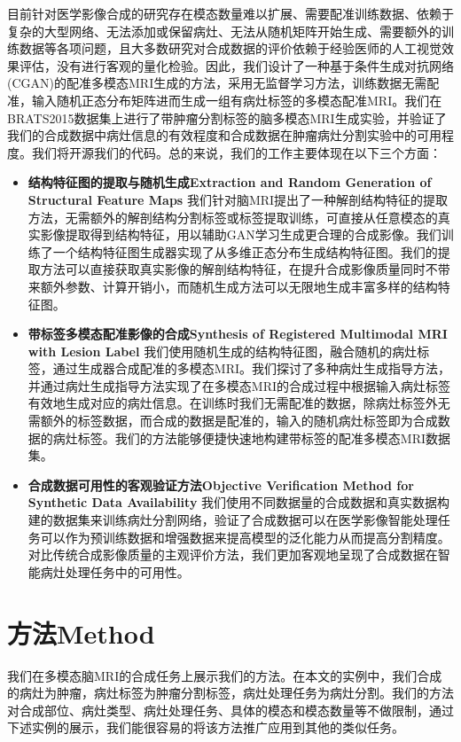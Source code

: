 \documentclass[letterpaper]{article} %
\begin{document}
目前针对医学影像合成的研究存在模态数量难以扩展、需要配准训练数据、依赖于复杂的大型网络、无法添加或保留病灶、无法从随机矩阵开始生成、需要额外的训练数据等各项问题，且大多数研究对合成数据的评价依赖于经验医师的人工视觉效果评估，没有进行客观的量化检验。因此，我们设计了一种基于条件生成对抗网络(CGAN)\cite{70mirza2014conditional}的配准多模态MRI生成的方法，采用无监督学习方法，训练数据无需配准，输入随机正态分布矩阵进而生成一组有病灶标签的多模态配准MRI。我们在BRATS2015数据集上进行了带肿瘤分割标签的脑多模态MRI生成实验，并验证了我们的合成数据中病灶信息的有效程度和合成数据在肿瘤病灶分割实验中的可用程度。我们将开源我们的代码。总的来说，我们的工作主要体现在以下三个方面：

\begin{itemize}
	\item \textbf{结构特征图的提取与随机生成Extraction and Random Generation of Structural Feature Maps}
	我们针对脑MRI提出了一种解剖结构特征的提取方法，无需额外的解剖结构分割标签或标签提取训练，可直接从任意模态的真实影像提取得到结构特征，用以辅助GAN学习生成更合理的合成影像。我们训练了一个结构特征图生成器实现了从多维正态分布生成结构特征图。我们的提取方法可以直接获取真实影像的解剖结构特征，在提升合成影像质量同时不带来额外参数、计算开销小，而随机生成方法可以无限地生成丰富多样的结构特征图。
	\item \textbf{带标签多模态配准影像的合成Synthesis of Registered Multimodal MRI with Lesion Label}
	我们使用随机生成的结构特征图，融合随机的病灶标签，通过生成器合成配准的多模态MRI。我们探讨了多种病灶生成指导方法，并通过病灶生成指导方法实现了在多模态MRI的合成过程中根据输入病灶标签有效地生成对应的病灶信息。在训练时我们无需配准的数据，除病灶标签外无需额外的标签数据，而合成的数据是配准的，输入的随机病灶标签即为合成数据的病灶标签。我们的方法能够便捷快速地构建带标签的配准多模态MRI数据集。
	\item \textbf{合成数据可用性的客观验证方法Objective Verification Method for Synthetic Data Availability}
	我们使用不同数据量的合成数据和真实数据构建的数据集来训练病灶分割网络，验证了合成数据可以在医学影像智能处理任务可以作为预训练数据和增强数据来提高模型的泛化能力从而提高分割精度。对比传统合成影像质量的主观评价方法，我们更加客观地呈现了合成数据在智能病灶处理任务中的可用性。
\end{itemize}


\section{方法Method}
\label{method}
我们在多模态脑MRI的合成任务上展示我们的方法。在本文的实例中，我们合成的病灶为肿瘤，病灶标签为肿瘤分割标签，病灶处理任务为病灶分割。我们的方法对合成部位、病灶类型、病灶处理任务、具体的模态和模态数量等不做限制，通过下述实例的展示，我们能很容易的将该方法推广应用到其他的类似任务。
\end{document}
